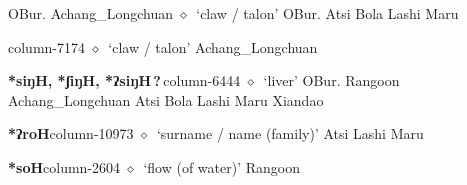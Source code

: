 \hspace{1ex}
         OBur. 
\hspace{1ex}
         Achang\_Longchuan 
\hspace{1ex}
         $\diamond$~`claw / talon'
         OBur. 
\hspace{1ex}
         Atsi 
\hspace{1ex}
         Bola 
\hspace{1ex}
         Lashi 
\hspace{1ex}
         Maru 
  \item {\footnotesize \textbf{}}{\tiny column-7174}
         $\diamond$~`claw / talon'
         Achang\_Longchuan 
  \item {\footnotesize \textbf{*siŋH, *ʃiŋH, *ʔsiŋH\,?\,}}{\tiny column-6444}
         $\diamond$~`liver'
         OBur. 
\hspace{1ex}
         Rangoon 
\hspace{1ex}
         Achang\_Longchuan 
\hspace{1ex}
         Atsi 
\hspace{1ex}
         Bola 
\hspace{1ex}
         Lashi 
\hspace{1ex}
         Maru 
\hspace{1ex}
         Xiandao 
  \item {\footnotesize \textbf{*ʔroH}}{\tiny column-10973}
         $\diamond$~`surname / name (family)'
         Atsi 
\hspace{1ex}
         Lashi 
\hspace{1ex}
         Maru 
  \item {\footnotesize \textbf{*soH}}{\tiny column-2604}
         $\diamond$~`flow (of water)'
         Rangoon 
\hspace{1ex}

